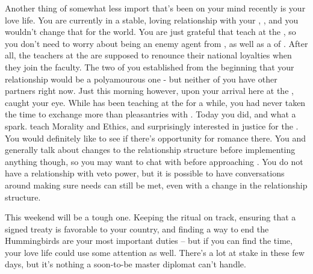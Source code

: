 \documentclass[char]{GL2020}
\begin{document}
Another thing of somewhat less import that's been on your mind recently is your love life. You are currently in a stable, loving relationship with your \cBeetle{\partner}, \cBeetle{\full}, and you wouldn't change that for the world. You are just grateful that \cBeetle{\they} teach\cBeetle{\pluralC} at the \pSc{}, so you don't need to worry about \cBeetle{\them} being an enemy agent from \pTech{}, as well as a \cBeetle{\cleric} of \cTechGod{}. After all, the teachers at the \pSc{} are supposed to renounce their national loyalties when they join the faculty. The two of you established from the beginning that your relationship would be a polyamourous one - but neither of you have other partners right now. Just this morning however, upon your arrival here at the \pSchool{}, \cEthics{\full} caught your eye. While \cEthics{} has been teaching at the \pSc{} for a while, you had never taken the time to exchange more than pleasantries with \cEthics{\them}. Today you did, and what a spark. \cEthics{\They} teach\cEthics{\pluralC} Morality and Ethics, and \cEthics{\are} surprisingly interested in justice for the \pShip{}. You would definitely like to see if there's opportunity for romance there. You and \cBeetle{} generally talk about changes to the relationship structure before implementing anything though, so you may want to chat with \cBeetle{\them} before approaching \cEthics{}. You do not have a relationship with veto power, but it is possible to have conversations around making sure needs can still be met, even with a change in the relationship structure.

This weekend will be a tough one. Keeping the ritual on track, ensuring that a signed treaty is favorable to your country, and finding a way to end the Hummingbirds are your most important duties -- but if you can find the time, your love life could use some attention as well. There's a lot at stake in these few days, but it's nothing a soon-to-be master diplomat can't handle.
\end{document}
